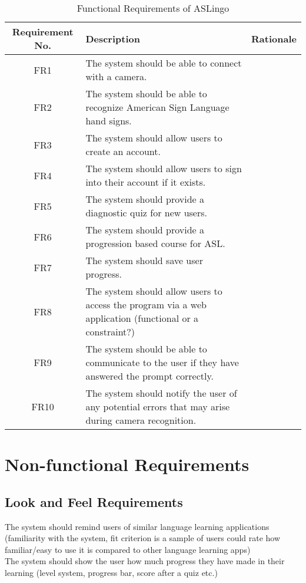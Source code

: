 \documentclass[12pt, titlepage]{article}
\begin{document}
\begin{table}
\caption{Functional Requirements of ASLingo}
\noindent \begin{tabular}{| c | p{4cm}| p{5cm}|}
\toprule 
\textbf{Requirement No.} & \textbf{Description} &\textbf{Rationale}\\
\midrule
FR1 & The system should be able to connect with a camera. & \\
\hline
FR2 & The system should be able to recognize American Sign Language hand signs. & \\
\hline
FR3 & The system should allow users to create an account. & \\
\hline
FR4 & The system should allow users to sign into their account if it exists. & \\
\hline
FR5 & The system should provide a diagnostic quiz for new users. & \\
\hline
FR6 & The system should provide a progression based course for ASL. & \\
\hline
FR7 & The system should save user progress. & \\
\hline
FR8 & The system should allow users to access the program via a web application (functional or a constraint?) & \\
\hline
FR9 & The system should be able to communicate to the user if they have answered the prompt correctly. & \\ %
\hline
FR10 & The system should notify the user of any potential errors that may arise during camera recognition. & \\
\bottomrule
\end{tabular}
\end{table}

\section{Non-functional Requirements}

\subsection{Look and Feel Requirements}

The system should remind users of similar language learning applications (familiarity with the system, fit criterion is a sample of users could rate how familiar/easy to use it is compared to other language learning apps) \\

The system should show the user how much progress they have made in their learning (level system, progress bar, score after a quiz etc.) \\
\end{document}
